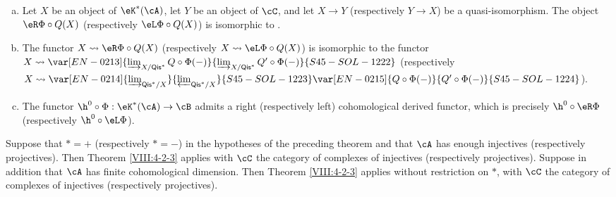 \begin{theorem}
\begin{enumerate}[a)]
    The restriction of the functor
    $Q'\circ \Phi:\eK^\ast(\cA) \to \eD^{\ast'}(\cB)$ to $\cC$ vanishes on the
    objects of $\cN$ and therefore factors through $\cC/\cN$. This gives
    a functor $\Phi':\cC/\cN\to \eD^{\ast'}(\cB)$. But the natural
    functor $\cC/\cN\to \eD^\ast(\cA)$ is an equivalence of categories
    (Theorem \ref{VIII:2-4-2}). Composing with its quasi-inverse gives the
    functor $\eR\Phi$ (respectively $\eL \Phi$).
  \item Let $X$ be an object of $\eK^\ast(\cA)$, let $Y$ be an object of
    $\cC$, and let $X\to Y$ (respectively $Y\to X$) be a
    quasi-isomorphism. The object $\eR\Phi\circ Q(X)$ (respectively
    $\eL \Phi\circ Q(X)$) is isomorphic to .
  \item The functor $X\leadsto \eR\Phi\circ Q(X)$ (respectively
    $X\leadsto \eL \Phi\circ Q(X)$) is isomorphic to the functor
    $X\leadsto \var[EN-0213]{\varinjlim_{X/\mathsf{Qis}^\ast} Q\circ\Phi(-)}{\varinjlim_{X/\mathsf{Qis}^\ast} Q'\circ\Phi(-)}{S45-SOL-1222}$
    (respectively
    $X\leadsto \var[EN-0214]{\varinjlim_{\mathsf{Qis}^\ast/X}}{\varprojlim_{\mathsf{Qis}^\ast/X}}{S45-SOL-1223} \var[EN-0215]{Q\circ \Phi(-)}{Q'\circ \Phi(-)}{S45-SOL-1224}$).
  \item The functor $\h^0{}\circ \Phi:\eK^\ast(\cA)\to \cB$ admits a
    right (respectively left) cohomological derived functor, which is
    precisely $\h^0{}\circ\eR\Phi$ (respectively
    $\h^0{}\circ \eL\Phi$).
\end{enumerate}
\end{theorem}

\begin{corollary}\label{VIII:4-2-3-1} %
Suppose that $\ast=+$ (respectively $\ast=-$) in the hypotheses of the
preceding theorem and that $\cA$ has enough injectives (respectively
projectives). Then Theorem \ref{VIII:4-2-3} applies with $\cC$ the
category of complexes of injectives (respectively projectives). Suppose
in addition that $\cA$ has finite cohomological dimension. Then Theorem \ref{VIII:4-2-3} applies without restriction on $\ast$, with $\cC$ the category
of complexes of injectives (respectively projectives).
\end{corollary}

